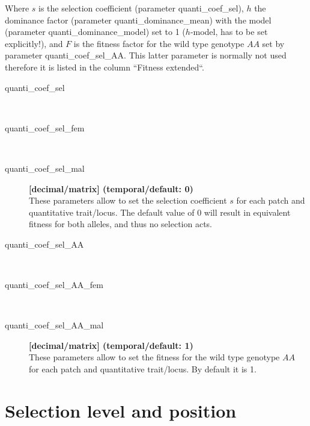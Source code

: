 \documentclass[letterpaper,12pt,oneside]{book}
\begin{document}
Where $s$ is the selection coefficient (parameter \textsf{quanti\_coef\_sel}), $h$ the dominance factor (parameter \textsf{quanti\_dominance\_mean}) with the model (parameter \textsf{quanti\_dominance\_model}) set to 1 ($h$-model, has to be set explicitly!), and $F$ is the fitness factor for the wild type genotype $AA$ set by parameter \textsf{quanti\_coef\_sel\_AA}. This latter parameter is normally not used therefore it is listed in the column ``Fitness extended``.
\begin{description}
\item[quanti\_coef\_sel]\hspace*{\fill}\\
\vspace{-9mm}
\item[quanti\_coef\_sel\_fem]\hspace*{\fill}\\
\vspace{-9mm}
\item[quanti\_coef\_sel\_mal]\textbf{[decimal/matrix] (temporal/default: 0)}\\
These parameters allow to set the selection coefficient $s$ for each patch and quantitative trait/locus. The default value of 0 will result in equivalent fitness for both alleles, and thus no selection acts.

\item[quanti\_coef\_sel\_AA]\hspace*{\fill}\\
\vspace{-9mm}
\item[quanti\_coef\_sel\_AA\_fem]\hspace*{\fill}\\
\vspace{-9mm}
\item[quanti\_coef\_sel\_AA\_mal]\textbf{[decimal/matrix] (temporal/default: 1)}\\
These parameters allow to set the fitness for the wild type genotype $AA$ for each patch and quantitative trait/locus. By default it is 1.
\end{description}

\section{Selection level and position}
\end{document}
